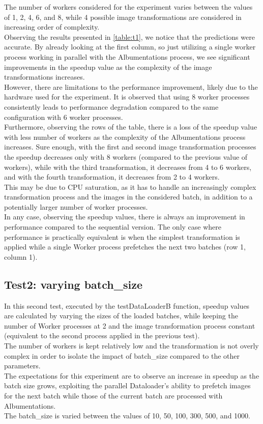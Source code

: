 \documentclass[10pt,twocolumn,letterpaper]{article}
\begin{document}
The number of workers considered for the experiment varies between the values of 1, 2, 4, 6, and 8, while 4 possible image transformations are considered in increasing order of complexity.\\
Observing the results presented in \cref{table:t1}, we notice that the predictions were accurate. By already looking at the first column, so just utilizing a single worker process working in parallel with the Albumentations process, we see significant improvements in the speedup value as the complexity of the image transformations increases.\\
However, there are limitations to the performance improvement, likely due to the hardware used for the experiment. It is observed that using 8 worker processes consistently leads to performance degradation compared to the same configuration with 6 worker processes.\\
Furthermore, observing the rows of the table, there is a loss of the speedup value with less number of workers as the complexity of the Albumentations process increases. Sure enough, with the first and second image transformation processes the speedup decreases only with 8 workers (compared to the previous value of workers), while with the third transformation, it decreases from 4 to 6 workers, and with the fourth transformation, it decreases from 2 to 4 workers.\\
This may be due to CPU saturation, as it has to handle an increasingly complex transformation process and the images in the considered batch, in addition to a potentially larger number of worker processes.\\
In any case, observing the speedup values, there is always an improvement in performance compared to the sequential version. The only case where performance is practically equivalent is when the simplest transformation is applied while a single Worker process prefetches the next two batches (row 1, column 1).

\subsection{Test2: varying batch\_size}

In this second test, executed by the testDataLoaderB function, speedup values are calculated by varying the sizes of the loaded batches, while keeping the number of Worker processes at 2 and the image transformation process constant (equivalent to the second process applied in the previous test).\\
The number of workers is kept relatively low and the transformation is not overly complex in order to isolate the impact of batch\_size compared to the other parameters.\\
The expectations for this experiment are to observe an increase in speedup as the batch size grows, exploiting the parallel Dataloader's ability to prefetch images for the next batch while those of the current batch are processed with Albumentations.\\
The batch\_size is varied between the values of 10, 50, 100, 300, 500, and 1000.
\end{document}
